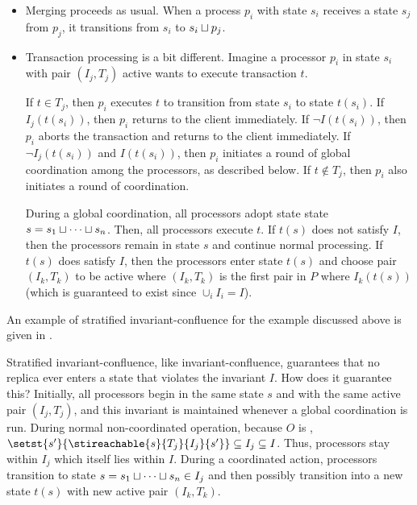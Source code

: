 \begin{itemize}
  \item
    Merging proceeds as usual. When a process $p_i$ with state $s_i$ receives a
    state $s_j$ from $p_j$, it transitions from $s_i$ to $s_i \sqcup p_j$.

  \item
    Transaction processing is a bit different. Imagine a processor $p_i$ in
    state $s_i$ with pair $(I_j, T_j)$ active wants to execute transaction $t$.

    If $t \in T_j$, then $p_i$ executes $t$ to transition from state $s_i$ to
    state $t(s_i)$. If $I_j(t(s_i))$, then $p_i$ returns to the client
    immediately. If $\lnot I(t(s_i))$, then $p_i$ aborts the transaction and
    returns to the client immediately. If $\lnot I_j(t(s_i))$ and $I(t(s_i))$,
    then $p_i$ initiates a round of global coordination among the processors,
    as described below.  If $t \notin T_j$, then $p_i$ also initiates a round
    of coordination.

    During a global coordination, all processors adopt state state $s = s_1
    \sqcup \cdots \sqcup s_n$. Then, all processors execute $t$. If $t(s)$ does
    not satisfy $I$, then the processors remain in state $s$ and continue
    normal processing.  If $t(s)$ does satisfy $I$, then the processors enter
    state $t(s)$ and choose pair $(I_k, T_k)$ to be active where $(I_k, T_k)$
    is the first pair in $P$ where $I_k(t(s))$ (which is guaranteed to exist
    since $\cup_i I_i = I$).
\end{itemize}

An example of stratified invariant-confluence for the example discussed above
is given in .

{}

Stratified invariant-confluence, like invariant-confluence, guarantees that no
replica ever enters a state that violates the invariant $I$. How does it
guarantee this?
%
Initially, all processors begin in the same state $s$ and with the same active
pair $(I_j, T_j)$, and this invariant is maintained whenever a global
coordination is run. During normal non-coordinated operation, because $O$ is
, $\setst{s'}{\stireachable{s}{T_j}{I_j}{s'}}
\subseteq I_j \subseteq I$. Thus, processors stay within $I_j$ which itself
lies within $I$. During a coordinated action, processors transition to state $s
= s_1 \sqcup \cdots \sqcup s_n \in I_j$ and then possibly transition into a new
state $t(s)$ with new active pair $(I_k, T_k)$.

